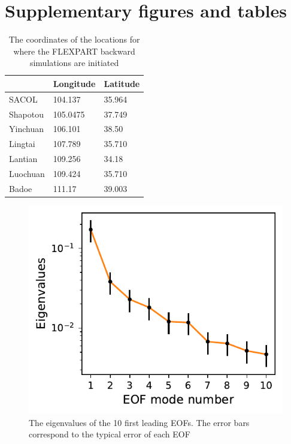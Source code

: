 
\chapter{Supplementary figures and tables}

\begin{table}[htpb]
\caption{The coordinates of the locations for where the FLEXPART backward simulations are initiated}
\centering
\label{tab:coordinates_clp}
\begin{tabular}{@{}lll@{}}
\toprule
 & Longitude & Latitude \\ \midrule
SACOL & 104.137 & 35.964 \\
Shapotou  & 105.0475 & 37.749  \\
Yinchuan & 106.101 & 38.50 \\
Lingtai & 107.789 &  35.710\\
Lantian & 109.256 & 34.18 \\
Luochuan & 109.424 &  35.710\\
Badoe & 111.17  &  39.003  \\ \bottomrule
\end{tabular}
\end{table}

\begin{figure}[htbp]
    \centering
    \includegraphics[scale=0.8]{texfiles/figs/EOF_north_test.pdf}
    \caption{The eigenvalues of the 10 first leading EOFs. The error bars correspond to the typical error of each EOF}
    \label{fig:eof_test}
\end{figure}


